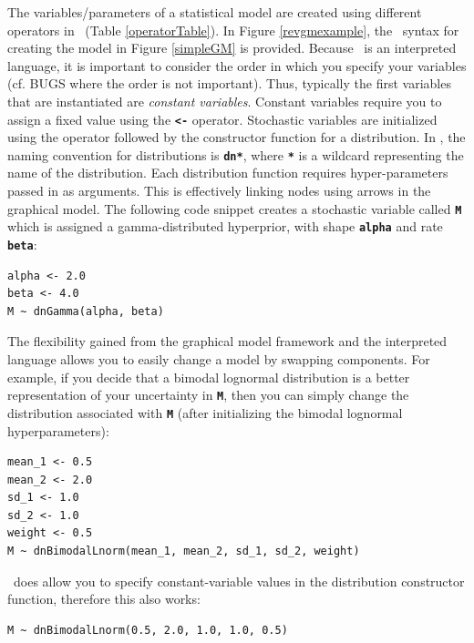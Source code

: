 \documentclass[11pt]{article}
\newcommand{\cl}[1]{{\texttt{\textbf{#1}}}}
\newcommand{\rbdn}{{\Large \symbol{126}}} %
\begin{document}
The variables/parameters of a statistical model are created using different operators in \Rev~(Table \ref{operatorTable}). 
In Figure \ref{revgmexample}, the \Rev~syntax for creating the model in Figure \ref{simpleGM} is provided.
Because \Rev~is an interpreted language, it is important to consider the order in which you specify your variables (cf. BUGS where the order is not important). 
Thus, typically the first variables that are instantiated are \emph{constant variables}. 
Constant variables require you to assign a fixed value using the \cl{<-} operator. 
Stochastic variables are initialized using the \cl{\rbdn} operator followed by the constructor function for a distribution. 
In \Rev, the naming convention for distributions is \cl{dn*}, where \cl{*} is a wildcard representing the name of the distribution. 
Each distribution function requires hyper-parameters passed in as arguments. 
This is effectively linking nodes using arrows in the graphical model.
The following code snippet creates a stochastic variable called \cl{M} which is assigned a gamma-distributed hyperprior, with shape \cl{alpha} and rate \cl{beta}:
{\tt \begin{snugshade*}
\begin{lstlisting}
alpha <- 2.0
beta <- 4.0
M ~ dnGamma(alpha, beta)
\end{lstlisting}
\end{snugshade*}}

The flexibility gained from the graphical model framework and the interpreted language allows you to easily change a model by swapping components. 
For example, if you decide that a bimodal lognormal distribution is a better representation of your uncertainty in \cl{M}, then you can simply change the distribution associated with \cl{M} (after initializing the bimodal lognormal hyperparameters):
{\tt \begin{snugshade*}
\begin{lstlisting}
mean_1 <- 0.5
mean_2 <- 2.0
sd_1 <- 1.0
sd_2 <- 1.0
weight <- 0.5
M ~ dnBimodalLnorm(mean_1, mean_2, sd_1, sd_2, weight)
\end{lstlisting}
\end{snugshade*}}

\Rev~does allow you to specify constant-variable values in the distribution constructor function, therefore this also works:
{\tt \begin{snugshade*}
\begin{lstlisting}
M ~ dnBimodalLnorm(0.5, 2.0, 1.0, 1.0, 0.5)
\end{lstlisting}
\end{snugshade*}}
\end{document}
